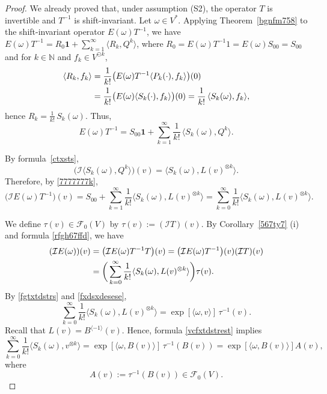 \documentclass[12pt]{article}
\theoremstyle{remark}
\theoremstyle{remark}
\theoremstyle{remark}
\begin{document}
\begin{proof}
We already proved that, under assumption (S2), the operator $T$ is invertible and $T^{-1}$ is shift-invariant.  Let $\omega \in V^*$. Applying Theorem~\ref{bgnfm758}   to the shift-invariant operator $E(\omega)T^{-1}$,  we have
$E(\omega)T^{-1}=R_0\mathbf 1+\sum_{k=1}^\infty \langle R_k,Q^{k}\rangle$,
where $R_0=E(\omega)T^{-1}1=E(\omega)S_{00}=S_{00}$ and for $k\in \mathbb N$ and $f_k\in V^{\odot k}$,
\begin{align}
\langle R_k,f_k\rangle &=\frac1{k!}\big(E(\omega)T^{-1}\langle P_k(\cdot),f_k\rangle\big)(0)\notag\\
&=\frac1{k!}\big(E(\omega) \langle S_k(\cdot),f_k\rangle\big)(0)=\frac1{k!}\,\langle S_k(\omega),f_k\rangle,\notag
\end{align}
hence $R_k=\frac1{k!}\, S_k(\omega)$. Thus,
\begin{equation}\label{7777777k}E(\omega)
T^{-1}=S_{00}\mathbf 1+\sum_{k=1}^\infty \frac1{k!}\,\langle S_k(\omega),Q^{k}\rangle.\end{equation}
 


 By formula~\eqref{ctxsts}, 
\begin{equation}\label{dsrsa5uewu6}
\big(\mathcal I\langle S_k(\omega),Q^{k}\rangle\big)(v)=\langle S_k(\omega),L(v)^{\otimes k}\rangle.\end{equation}
Therefore, by \eqref{7777777k},
\begin{equation}\label{rfgh67ffd}
\big(\mathcal I E(\omega)T^{-1}\big)(v)=
S_{00}+\sum_{k=1}^\infty\frac1{k!}\langle S_k(\omega),L(v)^{\otimes k}\rangle=\sum_{k=0}^\infty\frac1{k!}\langle S_k(\omega),L(v)^{\otimes k}\rangle.
\end{equation}

We define $\tau(v)\in\mathcal F_0(V)$ by $\tau(v):=(\mathcal IT)(v)$. By Corollary~\ref{567ty7} (i) and formula \eqref{rfgh67ffd}, we have
\begin{align}
(\mathcal IE(\omega))(v)&=\big(\mathcal IE(\omega)T^{-1}T\big)(v)=\big(\mathcal IE(\omega)T^{-1}\big)(v)(\mathcal IT)(v)\notag\\
&=\bigg(\sum_{k=0}^\infty\frac1{k!}\langle S_k(\omega),L(v)^{\otimes k}\rangle\bigg)\tau(v). \label{fxdsxdesese}
\end{align}
 By \eqref{fgtxtdstrs} and \eqref{fxdsxdesese},
 \begin{equation}\label{vcfxtdstrest}
 \sum_{k=0}^\infty\frac1{k!}\langle S_k(\omega),L(v)^{\otimes k}\rangle=\exp[\langle\omega,v\rangle]\,\tau^{-1}(v).
 \end{equation} 
Recall that $L(v)=B^{\langle -1\rangle}(v)$. Hence, formula \eqref{vcfxtdstrest} implies 
\begin{equation}\label{fdxzrdzszsw}
\sum_{k=0}^\infty\frac1{k!}\langle S_k(\omega),v^{\otimes k}\rangle=\exp[\langle\omega,B(v)\rangle]\,\tau^{-1}(B(v))=\exp[\langle\omega,B(v)\rangle]A(v),\end{equation}
where 
\begin{equation}\label{vfsrar45w5y}A(v):=\tau^{-1}(B(v))\in\mathcal F_0(V).
\end{equation} 


\end{proof}
\end{document}
